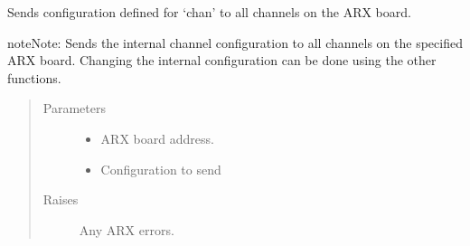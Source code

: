 \documentclass[letterpaper,10pt,english]{sphinxmanual}
\begin{document}
\begin{fulllineitems}

\begin{fulllineitems}
\label{\detokenize{index:lwautils.lwa_arx.ARX.set_all_chan_cfg}}
Sends configuration defined for ‘chan’ to all channels on the ARX board.

\begin{sphinxadmonition}{note}{Note:}
Sends the internal channel configuration to all channels
on the specified ARX board.
Changing the internal configuration can be done using the other
 functions.
\end{sphinxadmonition}
\begin{quote}\begin{description}
\item[{Parameters}] \leavevmode\begin{itemize}
\item {} 
 \textendash{} ARX board address.

\item {} 
 \textendash{} Configuration to send

\end{itemize}

\item[{Raises}] \leavevmode
{} \textendash{} Any ARX errors.

\end{description}\end{quote}





\end{fulllineitems}
\end{fulllineitems}
\end{document}
